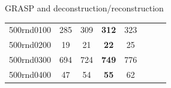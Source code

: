 \documentclass[10pt,xcolor=dvipsnames]{beamer}
\begin{document}
\begin{frame}{GRASP and deconstruction/reconstruction}
{\begin{center}
\begin{tabular}{|c|c|c|c|c|r|c|c|}
\hline
 500rnd0100 & 285 & 309 & \textbf{312} & 323    \\
 500rnd0200 & 19 & 21 & \textbf{22} & 25    \\
 500rnd0300 & 694 & 724 & \textbf{749} & 776    \\
 500rnd0400 & 47 & 54 & \textbf{55} & 62   \\

\end{tabular}
\end{center}}
\end{frame}
\end{document}
